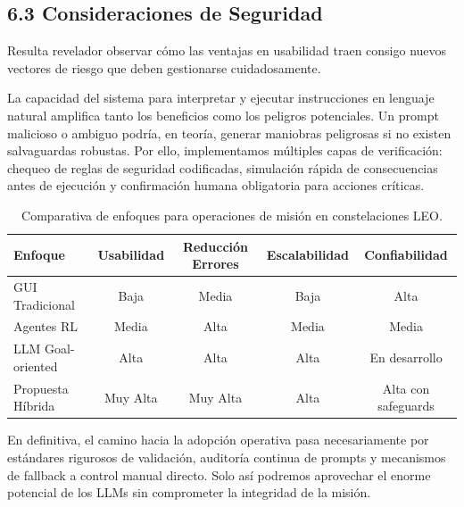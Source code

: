 \subsection{6.3 Consideraciones de Seguridad}

Resulta revelador observar cómo las ventajas en usabilidad traen consigo nuevos vectores de riesgo que deben gestionarse cuidadosamente. 

La capacidad del sistema para interpretar y ejecutar instrucciones en lenguaje natural amplifica tanto los beneficios como los peligros potenciales. Un prompt malicioso o ambiguo podría, en teoría, generar maniobras peligrosas si no existen salvaguardas robustas. Por ello, implementamos múltiples capas de verificación: chequeo de reglas de seguridad codificadas, simulación rápida de consecuencias antes de ejecución y confirmación humana obligatoria para acciones críticas.

\begin{table}[t]
\centering
\caption{Comparativa de enfoques para operaciones de misión en constelaciones LEO.}
\label{tab:comparativa_enfoques}
\begin{tabular}{lcccc}
\toprule
Enfoque & Usabilidad & Reducción Errores & Escalabilidad & Confiabilidad \\
\midrule
GUI Tradicional & Baja & Media & Baja & Alta \\
Agentes RL & Media & Alta & Media & Media \\
LLM Goal-oriented & Alta & Alta & Alta & En desarrollo \\
Propuesta Híbrida & Muy Alta & Muy Alta & Alta & Alta con safeguards \\
\bottomrule
\end{tabular}
\end{table}

En definitiva, el camino hacia la adopción operativa pasa necesariamente por estándares rigurosos de validación, auditoría continua de prompts y mecanismos de fallback a control manual directo. Solo así podremos aprovechar el enorme potencial de los LLMs sin comprometer la integridad de la misión.